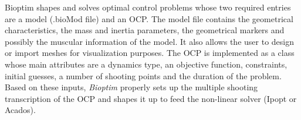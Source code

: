 Bioptim shapes and solves optimal control problems whose two required entries are a model (.bioMod file) and an OCP. 
The model file contains the geometrical characteristics, the mass and inertia parameters, the geometrical markers and possibly the muscular information of the model. 
It also allows the user to design or import meshes for visualization purposes.
The OCP is implemented as a class whose main attributes are a dynamics type, an objective function, constraints, initial guesses, a number of shooting points and the duration of the problem.
Based on these inputs, \textit{Bioptim} properly sets up the multiple shooting transcription of the OCP and shapes it up to feed the non-linear solver (Ipopt or Acados). 